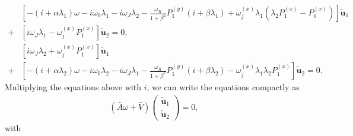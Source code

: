 \begin{subequations}
\begin{align}
    \nonumber&\left[-(i+\alpha\lambda_1)\omega - i\omega_0\lambda_1 - i\omega_J\lambda_2 -\frac{\omega_R}{1+\beta^2}P^{(y)}_1(i+\beta\lambda_1) + \omega^{(x)}_j\lambda_1(\lambda_2P^{(x)}_1 - P^{(x)}_0)\right]\tilde{\mathbold{u}}_1 \\
    + &\left[ i\omega_J\lambda_1 - \omega^{(x)}_jP^{(x)}_1 \right]\tilde{\mathbold{u}}_2 = 0, \\
    \nonumber&\left[i\omega_J\lambda_2 + \omega^{(x)}_jP^{(x)}_1\right]\tilde{\mathbold{u}}_1 \\
    + &\left[-(i+\alpha\lambda_2)\omega - i\omega_0\lambda_2 - i\omega_J\lambda_1 -\frac{\omega_R}{1+\beta^2}P^{(y)}_1(i+\beta\lambda_2) - \omega^{(x)}_j\lambda_1\lambda_2P^{(x)}_1 \right]\tilde{\mathbold{u}}_2 = 0.
\end{align}
\end{subequations}
Multiplying the equations above with $i$, we can write the equations compactly as
\begin{align}
    \label{eq:EigenvalueEqn_app}
    \left(\bar{A}\omega + \bar{V}\right)
    \begin{pmatrix}
     \tilde{\mathbold{u}}_1 \\
     \tilde{\mathbold{u}}_2
    \end{pmatrix}
    = 0,
\end{align}
with
